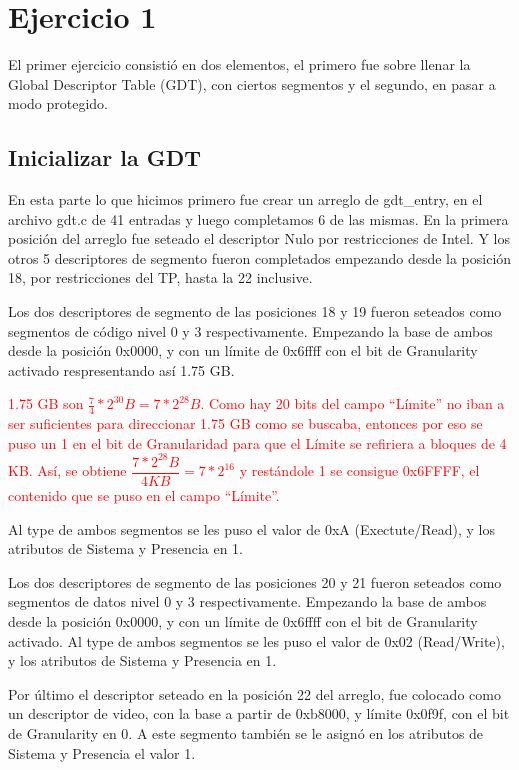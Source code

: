 \section{Ejercicio 1}
\par{El primer ejercicio consistió en dos elementos, el primero fue sobre llenar la Global Descriptor Table (GDT), con ciertos segmentos y el segundo, en pasar a modo protegido.}

\subsection*{Inicializar la GDT}
\par{En esta parte lo que hicimos primero fue crear un arreglo de gdt\_entry, en el archivo gdt.c de 41 entradas y luego completamos 6 de las mismas. En la primera posición del arreglo fue seteado el descriptor Nulo por restricciones de Intel. Y los otros 5 descriptores de segmento fueron completados empezando desde la posición 18, por restricciones del TP,  hasta la 22 inclusive.
\par{Los dos descriptores de segmento de las posiciones 18 y 19 fueron seteados como segmentos de código nivel 0 y 3 respectivamente. Empezando la base de ambos desde la posición 0x0000, y con un límite de 0x6ffff con el bit de Granularity activado respresentando así 1.75 GB.}
\par{\textcolor{red}{1.75 GB son $\frac{7}{4}*2^{30} B = 7*2^{28} B$. Como hay 20 bits del campo ``Límite'' no iban a ser suficientes para direccionar 1.75 GB como se buscaba, entonces por eso se puso un 1 en el bit de Granularidad para que el Límite se refiriera a bloques de 4 KB. Así, se obtiene $\dfrac{7*2^{28} B}{4 KB} = 7*2^{16}$ y restándole 1 se consigue 0x6FFFF, el contenido que se puso en el campo ``Límite''.}}
\par{Al type de ambos segmentos se les puso el valor de 0xA (Exectute/Read), y los atributos  de Sistema y Presencia en 1.}
\par{Los dos descriptores de segmento de las posiciones 20 y 21 fueron seteados como segmentos de datos nivel 0 y 3 respectivamente. Empezando la base de ambos desde la posición 0x0000, y con un límite de 0x6ffff con el bit de Granularity activado. Al type de ambos segmentos se les puso el valor de 0x02 (Read/Write), y los atributos de Sistema y Presencia en 1.}
\par{Por último el descriptor seteado en la posición 22 del arreglo, fue colocado como un descriptor de video, con la base a partir de 0xb8000, y límite 0x0f9f, con el bit de Granularity en 0. A este segmento también se le asignó en los atributos de Sistema y Presencia el valor 1.}


}
